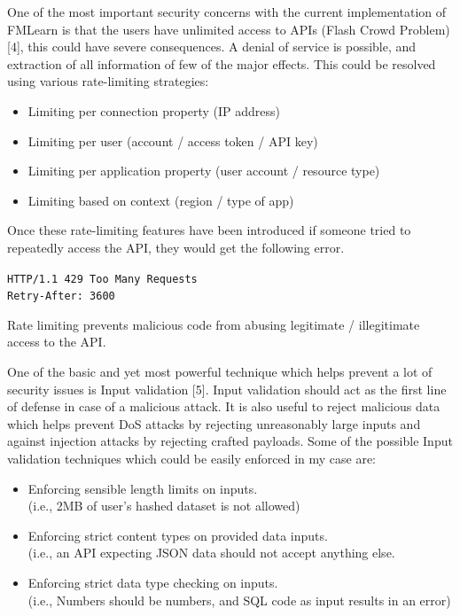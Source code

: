 One of the most important security concerns with the current implementation of FMLearn is that the users have unlimited access to APIs (Flash Crowd Problem) [4], this could have severe consequences. A denial of service is possible, and extraction of all information of few of the major effects. This could be resolved using various rate-limiting strategies:

\begin{itemize} 
    \item Limiting per connection property (IP address)
    \item Limiting per user (account / access token / API key)
    \item Limiting per application property (user account / resource type)
    \item Limiting based on context (region / type of app)
\end{itemize}

Once these rate-limiting features have been introduced if someone tried to repeatedly access the API, they would get the following error.

\quad\quad\quad\quad\quad\quad\quad\quad\quad\quad\quad\quad\quad
\texttt{HTTP/1.1 429 Too Many Requests}\\
\quad\quad\quad\quad\quad\quad\quad\quad\quad\quad\quad\quad\quad
\texttt{Retry-After: 3600}


Rate limiting prevents malicious code from abusing legitimate / illegitimate access to the API.

One of the basic and yet most powerful technique which helps prevent a lot of security issues is Input validation [5]. Input validation should act as the first line of defense in case of a malicious attack. It is also useful to reject malicious data which helps prevent DoS attacks by rejecting unreasonably large inputs and against injection attacks by rejecting crafted payloads. Some of the possible Input validation techniques which could be easily enforced in my case are:

\begin{itemize}
    \item Enforcing sensible length limits on inputs.\\
    (i.e., 2MB of user’s hashed dataset is not allowed)
    \item Enforcing strict content types on provided data inputs.\\
    (i.e., an API expecting JSON data should not accept anything else.
    \item Enforcing strict data type checking on inputs.\\
    (i.e., Numbers should be numbers, and SQL code as input results in an error)
\end{itemize}

